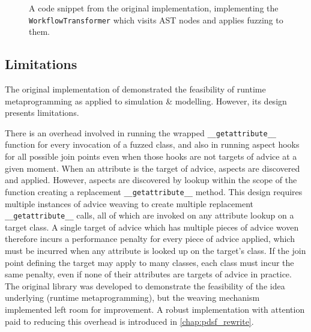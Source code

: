 \begin{figure}[hp]
    \centering
    
    \caption{A code snippet from the original \pdsf implementation, implementing
    the \lstinline{WorkflowTransformer} which visits AST nodes and applies
    fuzzing to them.}
    \label{fig:workflowtransformer_implementation}
\end{figure}


\subsection{Limitations}\label{subsec:prior_work_pdsf_limitations}

The original implementation of \pdsf demonstrated the feasibility
of runtime metaprogramming as applied to simulation \& modelling.
However, its design presents limitations.

There is an overhead involved in running the wrapped
\lstinline{__getattribute__} function for every invocation of a fuzzed class,
and also in running aspect hooks for all possible join points even when those
hooks are not targets of advice at a given moment. When an attribute is the
target of advice, aspects are discovered and applied. However, aspects are
discovered by lookup within the scope of the function creating a replacement
\lstinline{__getattribute__} method. This design requires multiple instances
of advice weaving to create multiple replacement \lstinline{__getattribute__}
calls, all of which are invoked on any attribute lookup on a target class. A single target of
advice which has multiple pieces of advice woven therefore incurs a performance
penalty for every piece of advice applied, which must be incurred when any
attribute is looked up on the target's class. If the join point defining the
target may apply to many classes, each class must incur the same penalty, even
if none of their attributes are targets of advice in practice. The original
library was developed to demonstrate the feasibility of the idea underlying
\pdsf{} (runtime metaprogramming), but the weaving mechanism implemented left
room for improvement. A robust implementation with attention paid to reducing
this overhead is introduced in \cref{chap:pdsf_rewrite}.

